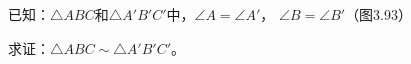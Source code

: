 \begin{figure}
    \centering
    \begin{tikzpicture}

    \end{tikzpicture}
    \caption{}
\end{figure}

已知：$\triangle ABC$和$\triangle A'B'C'$中，$\angle A=\angle A'$，
$\angle B=\angle B'$（图3.93）

求证：$\triangle ABC\sim \triangle A'B'C'$。

